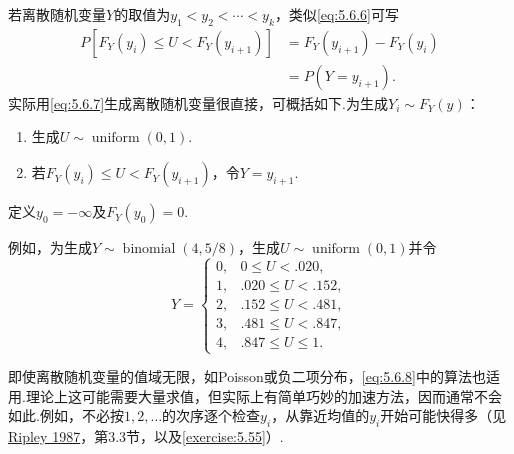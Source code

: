 若离散随机变量$Y$的取值为$y_1<y_2<\cdots<y_k$，类似\eqref{eq:5.6.6}可写
\begin{equation}\label{eq:5.6.7}
\begin{aligned}
P[F_Y(y_i)\le U<F_Y(y_{i+1})]&=F_Y(y_{i+1})-F_Y(y_i)\\
&=P(Y=y_{i+1}).
\end{aligned}
\end{equation}
实际用\eqref{eq:5.6.7}生成离散随机变量很直接，可概括如下.为生成$Y_i\sim F_Y(y)$：
\begin{enumerate}[label=\textbf{\alph*.}]
\item 生成$U\sim\operatorname{uniform}(0,1)$.
\item 若$F_Y(y_i)\le U<F_Y(y_{i+1})$，令$Y=y_{i+1}$.
\end{enumerate}
定义$y_0=-\infty$及$F_Y(y_0)=0$.
\begin{example}[二项随机变量的生成]\label{ex:5.6.5}
例如，为生成$Y\sim\operatorname{binomial}(4,5/8)$，生成$U\sim\operatorname{uniform}(0,1)$并令
\begin{equation}\label{eq:5.6.8}
Y=\begin{cases}0,&0\le U<.020,\\1,&.020\le U<.152,\\2,&.152\le U<.481,\\3,&.481\le U<.847,\\4,&.847\le U\le1.\end{cases}
\end{equation}
\end{example}
即使离散随机变量的值域无限，如Poisson或负二项分布，\eqref{eq:5.6.8}中的算法也适用.理论上这可能需要大量求值，但实际上有简单巧妙的加速方法，因而通常不会如此.例如，不必按$1,2,\ldots$的次序逐个检查$y_i$，从靠近均值的$y_i$开始可能快得多（见\hyperref[bib:source253]{Ripley 1987}，第3.3节，以及\autoref{exercise:5.55}）.

